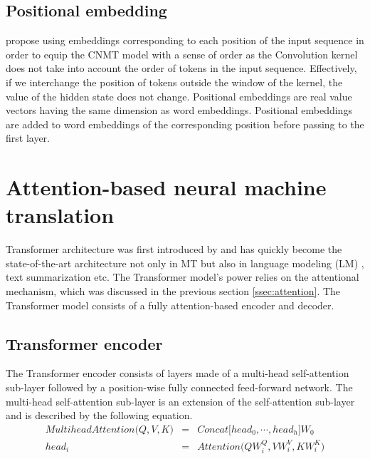\subsection{Positional embedding}
\citet{Ghering17convolutional} propose using embeddings corresponding to each position of the input sequence in order to equip the CNMT model with a sense of order as the Convolution kernel does not take into account the order of tokens in the input sequence. Effectively, if we interchange the position of tokens outside the window of the kernel, the value of the hidden state does not change. Positional embeddings are real value vectors having the same dimension as word embeddings. Positional embeddings are added to word embeddings of the corresponding position before passing to the first layer.

\section{Attention-based neural machine translation} \label{sec:transformer}
Transformer architecture was first introduced by \citet{Vaswani17attention} and has quickly become the state-of-the-art architecture not only in MT but also in language modeling (LM) \citep{Devlin19bert,Brown20language,Conneau19cross}, text summarization \citep{Zhang20pegasus} etc. The Transformer model's power relies on the attentional mechanism, which was discussed in the previous section \ref{ssec:attention}. The Transformer model consists of a fully attention-based encoder and decoder. 
\subsection{Transformer encoder}
The Transformer encoder consists of layers made of a multi-head self-attention sub-layer followed by a position-wise fully connected feed-forward network. The multi-head self-attention sub-layer is an extension of the self-attention sub-layer and is described by the following equation.
\begin{equation}
\begin{array}{rcl}
MultiheadAttention\big( Q,V,K \big) &=& Concat \big[ head_0, \cdots , head_h \big] W_0\\
head_i &=& Attention \big( QW_i^Q, VW_i^V, KW_i^K \big)\\
\end{array}
\end{equation}

